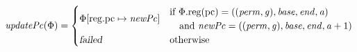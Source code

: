 \documentclass{article}
\newcommand{\update}[2]{[#1 \mapsto #2]}
\newcommand{\var}[1]{\mathit{#1}}
\newcommand{\gl}{\var{g}}
\newcommand{\pcreg}{\mathrm{pc}}
\newcommand{\addr}{\var{a}}
\newcommand{\start}{\var{base}}
\newcommand{\addrend}{\var{end}}
\newcommand{\perm}{\var{perm}}
\newcommand{\stdcap}[1][(\perm,\gl)]{\left(#1,\start,\addrend,\addr \right)}
\newcommand{\plainproj}[1]{\mathrm{#1}}
\newcommand{\memreg}[1][\Phi]{#1.\plainproj{reg}}
\newcommand{\updateReg}[3][\Phi]{#1\update{\plainproj{reg}.#2}{#3}}
\newcommand{\failed}{\textsl{failed}}
\newcommand{\plainfun}[2]{
  \ifthenelse{\equal{#2}{}}
             {\mathit{#1}}
             {\mathit{#1}(#2)}
}
\newcommand{\stdUpdatePc}[1]{\plainfun{updatePc}{#1}}
\begin{document}
\begin{align*}
  \stdUpdatePc{\Phi} &=
                       \begin{cases}
                         \updateReg{\pcreg}{\var{newPc}} & 
                           \arraycolsep=0pt
                           \begin{array}{l}
                             \text{if $\memreg(\pcreg) = \stdcap$}\\
                             \quad\text{and $\var{newPc} = ((\perm,\gl),\start,\addrend,\addr + 1)$}\\
                           \end{array} \\
                           \failed & \text{otherwise}
                       \end{cases} \\
\end{align*}
\end{document}
